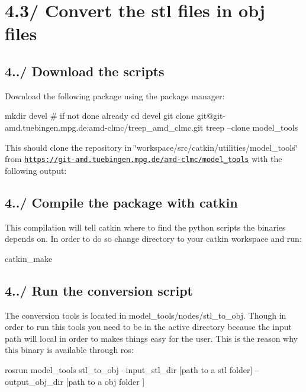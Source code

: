 \hypertarget{subsubpage_stl_to_obj}{}\section{4.3/ Convert the stl files in obj files}\label{subsubpage_stl_to_obj}
\hypertarget{subsubpage_stl_to_obj_stl_obj_sec_download}{}\subsection{4../ Download the scripts}\label{subsubpage_stl_to_obj_stl_obj_sec_download}
Download the following package using the package manager\+: 
\begin{DoxyCode}
mkdir devel # \textcolor{keywordflow}{if} not done already
cd devel
git clone git@git-amd.tuebingen.mpg.de:amd-clmc/treep\_amd\_clmc.git
treep --clone model\_tools
\end{DoxyCode}
 This should clone the repository in \char`\"{}workspace/src/catkin/utilities/model\+\_\+tools\char`\"{} from \href{https://git-amd.tuebingen.mpg.de/amd-clmc/model_tools}{\tt https\+://git-\/amd.\+tuebingen.\+mpg.\+de/amd-\/clmc/model\+\_\+tools} with the following output\+: \hypertarget{subsubpage_stl_to_obj_stl_obj_sec_compilation}{}\subsection{4../ Compile the package with catkin}\label{subsubpage_stl_to_obj_stl_obj_sec_compilation}
This compilation will tell catkin where to find the python scripts the binaries depends on. In order to do so change directory to your catkin workspace and run\+: 
\begin{DoxyCode}
catkin\_make
\end{DoxyCode}
\hypertarget{subsubpage_stl_to_obj_stl_obj_sec_run}{}\subsection{4../ Run the conversion script}\label{subsubpage_stl_to_obj_stl_obj_sec_run}
The conversion tools is located in model\+\_\+tools/nodes/stl\+\_\+to\+\_\+obj. Though in order to run this tools you need to be in the active directory because the input path will local in order to makes things easy for the user. This is the reason why this binary is available through ros\+: 
\begin{DoxyCode}
rosrun model\_tools stl\_to\_obj --input\_stl\_dir [path to a stl folder] --output\_obj\_dir [path to a obj folder
      ]
\end{DoxyCode}
